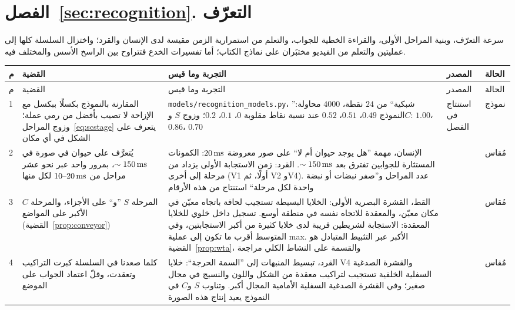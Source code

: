 \section{الفصل~\ref{sec:recognition}. التعرّف}

سرعة التعرّف، وبنية المراحل الأولى، والقراءة الخطية للجواب، والتعلم من استمرارية الزمن مقيسة لدى الإنسان والقرد؛ واختزال السلسلة كلها إلى عمليتين والتعلم من الفيديو مختبَران على نماذج الكتاب؛ أما تفسيرات الخدع فتتراوح بين الراسخ الأسس والمختلف فيه.

{\footnotesize
\setlength{\tabcolsep}{3pt}\renewcommand{\arraystretch}{1.15}
\begin{longtable}{>{\raggedright}p{0.5cm}>{\raggedright}p{4.0cm}>{\raggedright}p{5.6cm}>{\raggedright}p{2.3cm}>{\raggedright\arraybackslash}p{1.7cm}}
\toprule
م & القضية & التجربة وما قيس & المصدر & الحالة \\
\midrule\endfirsthead
\toprule
م & القضية & التجربة وما قيس & المصدر & الحالة \\
\midrule\endhead
1 & المقارنة بالنموذج بكسلًا ببكسل مع الإزاحة لا تصيب بأفضل من رمي عملة؛ وزوج المراحل~\eqref{eq:scstage} يتعرف على الشكل في أي مكان & \foreignlanguage{english}{\texttt{models/\allowbreak recognition\_models.py}}، ”شبكية“ من $24$ نقطة، $4000$ محاولة: النموذج $0.49$، $0.51$، $0.52$ عند نسبة نقاط مقلوبة $0$، $0.1$، $0.2$؛ وزوج $S$ و$C$: $1.00$، $0.86$، $0.70$ & استنتاج في الفصل & نموذج \\
2 & يُتعرَّف على حيوان في صورة في $\sim150\,\text{ms}$، بمرور واحد عبر نحو عشر مراحل من $10\text{--}20\,\text{ms}$ لكل منها & الإنسان، مهمة ”هل يوجد حيوان أم لا“ على صور معروضة $20\,\text{ms}$: الكمونات المستثارة للجوابين تفترق بعد $\sim150\,\text{ms}$. القرد: زمن الاستجابة الأولى يزداد من مرحلة إلى أخرى (\foreignlanguage{english}{V1} أولًا، ثم \foreignlanguage{english}{V2} و\foreignlanguage{english}{V4}). عدد المراحل و”صفر نبضات أو نبضة واحدة لكل مرحلة“ استنتاج من هذه الأرقام & \cite{Thorpe1996,Schmolesky1998} & مُقاس \\
3 & المرحلة $S$ ”و“ على الأجزاء، والمرحلة $C$ الأكبر على المواضع (القضية~\ref{prop:conveyor}) & القط، القشرة البصرية الأولى: الخلايا البسيطة تستجيب لحافة باتجاه معيّن في مكان معيّن، والمعقدة للاتجاه نفسه في منطقة أوسع. تسجيل داخل خلوي للخلايا المعقدة: الاستجابة لشريطين قريبة لدى خلايا كثيرة من أكبر الاستجابتين، وفي المتوسط أقرب ما تكون إلى عملية \foreignlanguage{english}{max}. الأكبر عبر التثبيط المتبادل هو القضية~\ref{prop:wta}، والقسمة على النشاط الكلي مراجعة & \cite{HubelWiesel1962,Lampl2004,Carandini2012} & مُقاس \\
4 & كلما صعدنا في السلسلة كبرت التراكيب وتعقدت، وقلّ اعتماد الجواب على الموضع & القرد، تبسيط المنبهات إلى ”السمة الحرجة“: خلايا \foreignlanguage{english}{V4} والقشرة الصدغية السفلية الخلفية تستجيب لتراكيب معقدة من الشكل واللون والنسيج في مجال صغير؛ وفي القشرة الصدغية السفلية الأمامية المجال أكبر. وتناوب $S$ و$C$ في النموذج يعيد إنتاج هذه الصورة & \cite{KobatakeTanaka1994,Riesenhuber1999} & مُقاس \\

\end{longtable}}
